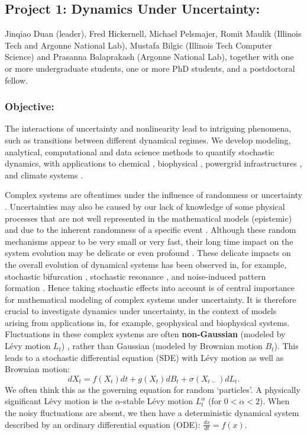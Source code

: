 \documentclass[11pt]{NSFamsart}
\begin{document}
\subsection*{Project 1: Dynamics  Under Uncertainty:} 
Jinqiao Duan (leader), Fred Hickernell, Michael Pelsmajer, Romit Maulik (Illinois Tech and Argonne National Lab),  
 Mustafa Bilgic (Illinois Tech Computer Science) and Prasanna Balaprakash (Argonne National Lab), together with one or more undergraduate students, one or more PhD students, and a postdoctoral fellow.  

\subsubsection*{Objective:} The interactions of uncertainty and nonlinearity lead to intriguing phenomena, such as  transitions   between  different dynamical regimes. We develop modeling, analytical, computational and data science  methods to quantify     stochastic dynamics, with applications to chemical \cite{agaoglou_chemical_2019}, biophysical \cite{Ruoff2018BiologicalCR}, powergrid infrastructures \cite{MEDJROUBI201714}, and climate systems \cite{Alexandrov2020NonlinearCD, Franzke2017NonlinearAS, Wan2020ADF}. 
 
Complex systems are oftentimes under the influence  of randomness or uncertainty \cite{Moss1, Horst, Gar, VanKampen3}. Uncertainties may also be caused by our lack of knowledge of some physical processes that are not well represented in the mathematical models (epistemic) and due to the inherent randomness of a specific event  \cite{Palmer1, Kantz, Wilks, Williams}.
Although these random mechanisms appear to be very small or very fast, their long time impact on the system evolution may be delicate or even profound \cite{Arnold, DuanBook2015}. These delicate impacts on the overall evolution of dynamical systems has been observed in, for example, stochastic bifurcation
\cite{Crauel, CarLanRob01, Horst}, stochastic resonance \cite{imkeller2002model},
 and  noise-induced pattern formation \cite{Gar, blomker2003pattern}.
Hence taking stochastic effects   into account is of
central importance for mathematical modeling of
complex systems under uncertainty.   It is therefore crucial to investigate dynamics under uncertainty, in the context of models arising from applications in, for example, geophysical and biophysical systems. Fluctuations in these complex systems are often {\bf non-Gaussian} (modeled by L\'evy motion $L_t$) \cite{Woy,Dit, Shlesinger,taqqu,dybiec2009levy}, rather than Gaussian (modeled by Brownian motion $B_t$). This leads to a
 stochastic   differential equation (SDE)  \cite{Arnold,   Oksendal, DuanBook2015, Applebaum}
 with L\'evy motion as well as Brownian motion:
 $$
 dX_t= f(X_t) dt + g(X_t) dB_t + \sigma(X_{t-}) dL_t.
 $$
 We often think this as the governing equation for random `particles'. A physically significant L\'evy motion is the  $\alpha$-stable L\'evy motion $L_t^\alpha$ (for $0<\alpha<2$).  
 When the noisy fluctuations are absent, we then have a   deterministic  dynamical system described by an ordinary differential equation (ODE): $ \frac{dx}{dt}=f(x).$
 
\end{document}

